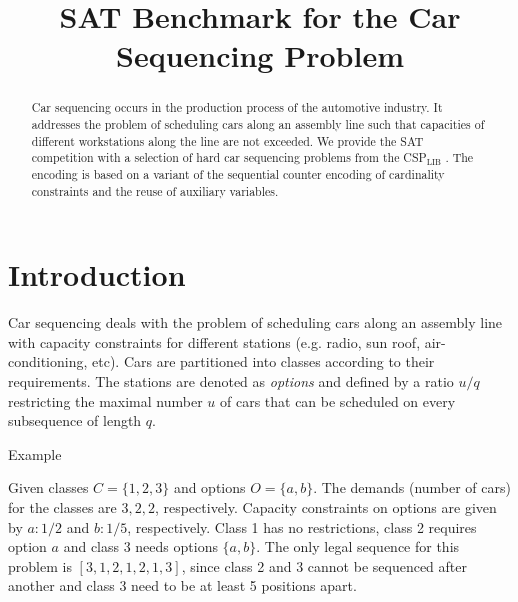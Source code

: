 \documentclass[conference]{IEEEtran}
\newcounter{Examplecount}
\newenvironment{example}
{%
    \stepcounter{Examplecount} Example \arabic{Examplecount} 
\begin{it}
    } 
    {%
\end{it} 
}
\begin{document}
%
\title{SAT Benchmark for the Car Sequencing Problem}


\author{
}

\maketitle


\begin{abstract}
    Car sequencing occurs in the production process of the automotive industry. It addresses the problem of scheduling
    cars along an assembly line such that capacities of different workstations along the line are not exceeded. We
    provide the SAT competition with a selection of hard car sequencing problems from the CSP$_{\mbox{LIB}}$
    \cite{Gent99}. The encoding is based on a variant of the sequential counter encoding of cardinality constraints and
    the reuse of auxiliary variables.  
\end{abstract}
\IEEEpeerreviewmaketitle

\section{Introduction}

Car sequencing deals with the problem of scheduling cars along an assembly line with capacity constraints for different
stations (e.g. radio, sun roof, air-conditioning, etc). Cars are partitioned into classes according to their
requirements. The stations are denoted as \emph{options} and defined by a ratio $u/q$ restricting the maximal number $u$
of cars that can be scheduled on every subsequence of length $q$.

\begin{example} 
    Given classes $C = \{1,2,3\}$ and options $O = \{a,b\}$. The demands (number of cars) for the classes are $3,2,2$,
    respectively. Capacity constraints on options are given by $a:1/2$ and $b:1/5$, respectively. Class 1 has no restrictions,
    class 2 requires option $a$ and class 3 needs options $\{a, b\}$. The only legal sequence for this problem is
    $[3,1,2,1,2,1,3]$, since class 2 and 3 cannot be sequenced after another and class 3 need to be at least 5 positions
    apart.
\end{example}                                     
\end{document}
